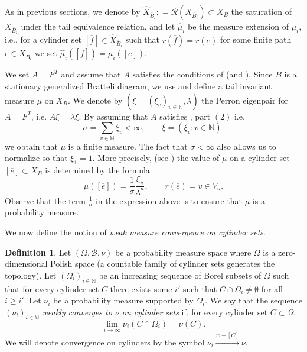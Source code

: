 \documentclass[11pt,reqno]{amsart}
\theoremstyle{definition}
\newtheorem{definition}{Definition}[section]
\theoremstyle{remark}
\theoremstyle{plain}
\def\ol{\overline}
\def\wh{\widehat}
\newcommand{\N}{\mathbb N}
\newcommand{\B}{\mathcal B}
\numberwithin{equation}{section}
\begin{document}
As in previous sections, we denote by $\wh X_{\ol B_i}: = \mathcal{R}(X_{\ol B_i}) \subset X_B$ the saturation of $X_{\ol B_i}$ under the tail equivalence relation, and let $\wh \mu_i$ be the measure extension of $\mu_i$, i.e., for a cylinder set $[\ol{f}] \in \wh X_{\ol B_i}$ such that $r(\ol{f}) = r(\ol{e})$ for some finite path $\ol{e} \in X_{\ol B_i}$ we set $\wh \mu_i([\ol{f}]) = \mu_i([\ol{e}])$.

We set $A = F^T$ and assume that $A$ satisfies the conditions of  (and ). Since $B$ is a stationary generalized Bratteli diagram, we use  and define a tail invariant measure $\mu$ on $X_B$. We denote by $(\ol \xi = (\xi_v)_{v \in \N}, \lambda)$ the Perron eigenpair for $A = F^T$, i.e. $A \ol \xi = \lambda \ol \xi$. By assuming that $A$ satisfies , part $(2)$ i.e.
\[
\sigma = \underset{v \in \N}{\sum} \xi_v < \infty, \qquad  \xi = (\xi_v : v \in \N).
\] we obtain that $\mu$ is a finite measure. The fact that $\sigma < \infty$ also allows us to normalize so that $\xi_1 =1$. 
More precisely, (see ) the value of $\mu$ on a cylinder set $[\ol e] \subset X_B$ is determined by the formula
\begin{equation}\label{mu}
\mu ([\overline e]) = \frac{1}{\sigma} \frac{\xi_v}{\lambda^n}, \qquad r(\ol e) = v \in V_n. 
\end{equation}Observe that the term $\frac{1}{\sigma}$ in the expression above is to ensure that $\mu$ is a probability measure.

\vspace{3mm}

\noindent We now define the notion of \textit{weak measure convergence on cylinder sets}. 

\begin{definition}\label{Def: weak_conv}
Let $(\Omega, \B, \nu)$ be a probability measure space where $\Omega$ is a zero-dimensional Polish space (a countable family of cylinder sets generates the topology). Let $(\Omega_i)_{i \in \N}$ be an increasing sequence of Borel subsets of $\Omega$ such that for every cylinder set $C$ there exists some $i'$ such that $C \cap \Omega_i\neq \emptyset$ 
for all $i \geq i'$. Let $\nu_i$ be a probability measure supported by $\Omega_i$. We say that the sequence $(\nu_i)_{i \in \N}$ \textit{weakly converges to $\nu$ on cylinder sets} if, 
for every cylinder set $C \subset \Omega$, 
$$
\lim_{i\to \infty} \nu_i (C \cap \Omega_i) = \nu (C).
$$ 
We will denote convergence on cylinders by the symbol $\nu_i \xrightarrow{w-[C]} \nu$. 
\end{definition}
\end{document}

